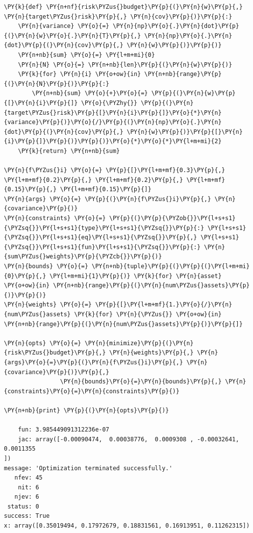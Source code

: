 \begin{tcolorbox}[breakable, size=fbox, boxrule=1pt, pad at break*=1mm,colback=cellbackground, colframe=cellborder]
\begin{Verbatim}[commandchars=\\\{\}]
\PY{k}{def} \PY{n+nf}{risk\PYZus{}budget}\PY{p}{(}\PY{n}{w}\PY{p}{,} \PY{n}{target\PYZus{}risk}\PY{p}{,} \PY{n}{cov}\PY{p}{)}\PY{p}{:}
    \PY{n}{variance} \PY{o}{=} \PY{n}{np}\PY{o}{.}\PY{n}{dot}\PY{p}{(}\PY{n}{w}\PY{o}{.}\PY{n}{T}\PY{p}{,} \PY{n}{np}\PY{o}{.}\PY{n}{dot}\PY{p}{(}\PY{n}{cov}\PY{p}{,} \PY{n}{w}\PY{p}{)}\PY{p}{)} 
    \PY{n+nb}{sum} \PY{o}{=} \PY{l+m+mi}{0}
    \PY{n}{N} \PY{o}{=} \PY{n+nb}{len}\PY{p}{(}\PY{n}{w}\PY{p}{)}
    \PY{k}{for} \PY{n}{i} \PY{o+ow}{in} \PY{n+nb}{range}\PY{p}{(}\PY{n}{N}\PY{p}{)}\PY{p}{:}
        \PY{n+nb}{sum} \PY{o}{+}\PY{o}{=} \PY{p}{(}\PY{n}{w}\PY{p}{[}\PY{n}{i}\PY{p}{]} \PY{o}{\PYZhy{}} \PY{p}{(}\PY{n}{target\PYZus{}risk}\PY{p}{[}\PY{n}{i}\PY{p}{]}\PY{o}{*}\PY{n}{variance}\PY{p}{)}\PY{o}{/}\PY{p}{(}\PY{n}{np}\PY{o}{.}\PY{n}{dot}\PY{p}{(}\PY{n}{cov}\PY{p}{,} \PY{n}{w}\PY{p}{)}\PY{p}{[}\PY{n}{i}\PY{p}{]}\PY{p}{)}\PY{p}{)}\PY{o}{*}\PY{o}{*}\PY{l+m+mi}{2} 
    \PY{k}{return} \PY{n+nb}{sum}
	
\PY{n}{f\PYZus{}i} \PY{o}{=} \PY{p}{[}\PY{l+m+mf}{0.3}\PY{p}{,} \PY{l+m+mf}{0.2}\PY{p}{,} \PY{l+m+mf}{0.2}\PY{p}{,} \PY{l+m+mf}{0.15}\PY{p}{,} \PY{l+m+mf}{0.15}\PY{p}{]} 
\PY{n}{args} \PY{o}{=} \PY{p}{(}\PY{n}{f\PYZus{}i}\PY{p}{,} \PY{n}{covariance}\PY{p}{)}
\PY{n}{constraints} \PY{o}{=} \PY{p}{(}\PY{p}{\PYZob{}}\PY{l+s+s1}{\PYZsq{}}\PY{l+s+s1}{type}\PY{l+s+s1}{\PYZsq{}}\PY{p}{:} \PY{l+s+s1}{\PYZsq{}}\PY{l+s+s1}{eq}\PY{l+s+s1}{\PYZsq{}}\PY{p}{,} \PY{l+s+s1}{\PYZsq{}}\PY{l+s+s1}{fun}\PY{l+s+s1}{\PYZsq{}}\PY{p}{:} \PY{n}{sum\PYZus{}weights}\PY{p}{\PYZcb{}}\PY{p}{)}          
\PY{n}{bounds} \PY{o}{=} \PY{n+nb}{tuple}\PY{p}{(}\PY{p}{(}\PY{l+m+mi}{0}\PY{p}{,} \PY{l+m+mi}{1}\PY{p}{)} \PY{k}{for} \PY{n}{asset} \PY{o+ow}{in} \PY{n+nb}{range}\PY{p}{(}\PY{n}{num\PYZus{}assets}\PY{p}{)}\PY{p}{)}
\PY{n}{weights} \PY{o}{=} \PY{p}{[}\PY{l+m+mf}{1.}\PY{o}{/}\PY{n}{num\PYZus{}assets} \PY{k}{for} \PY{n}{\PYZus{}} \PY{o+ow}{in} \PY{n+nb}{range}\PY{p}{(}\PY{n}{num\PYZus{}assets}\PY{p}{)}\PY{p}{]}
	
\PY{n}{opts} \PY{o}{=} \PY{n}{minimize}\PY{p}{(}\PY{n}{risk\PYZus{}budget}\PY{p}{,} \PY{n}{weights}\PY{p}{,} \PY{n}{args}\PY{o}{=}\PY{p}{(}\PY{n}{f\PYZus{}i}\PY{p}{,} \PY{n}{covariance}\PY{p}{)}\PY{p}{,} 
                \PY{n}{bounds}\PY{o}{=}\PY{n}{bounds}\PY{p}{,} \PY{n}{constraints}\PY{o}{=}\PY{n}{constraints}\PY{p}{)}
	
\PY{n+nb}{print} \PY{p}{(}\PY{n}{opts}\PY{p}{)}

    fun: 3.985449091312236e-07
    jac: array([-0.00090474,  0.00038776,  0.0009308 , -0.00032641,  0.0011355
])
message: 'Optimization terminated successfully.'
   nfev: 45
    nit: 6
   njev: 6
 status: 0
success: True
x: array([0.35019494, 0.17972679, 0.18831561, 0.16913951, 0.11262315])
\end{Verbatim}
\end{tcolorbox}

